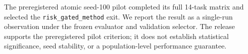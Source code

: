 The preregistered atomic seed-100 pilot completed its full 14-task
matrix and selected the \texttt{risk\_gated\_method} exit. We report the
result as a single-run observation under the frozen evaluator and
validation selector. The release supports the preregistered pilot
criterion; it does not establish statistical significance, seed
stability, or a population-level performance guarantee.
